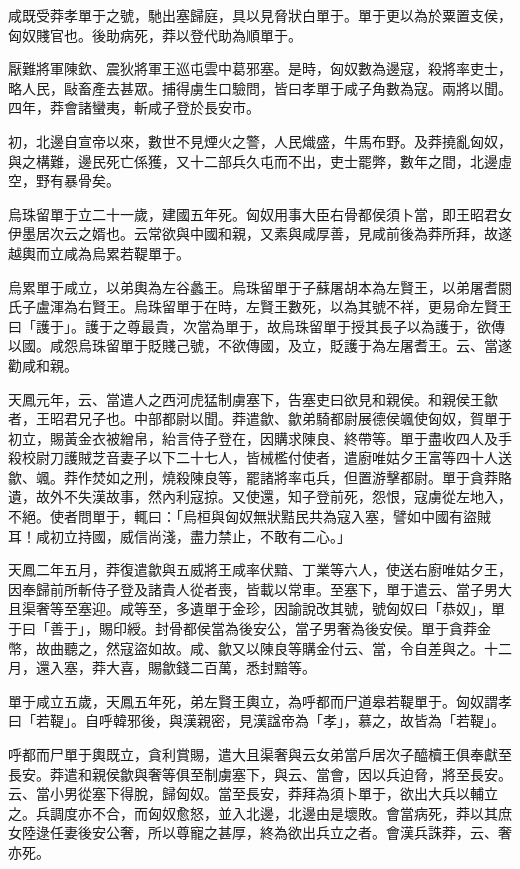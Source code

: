\begin{pinyinscope}
咸既受莽孝單于之號，馳出塞歸庭，具以見脅狀白單于。單于更以為於粟置支侯，匈奴賤官也。後助病死，莽以登代助為順單于。

厭難將軍陳欽、震狄將軍王巡屯雲中葛邪塞。是時，匈奴數為邊寇，殺將率吏士，略人民，敺畜產去甚眾。捕得虜生口驗問，皆曰孝單于咸子角數為寇。兩將以聞。四年，莽會諸蠻夷，斬咸子登於長安市。

初，北邊自宣帝以來，數世不見煙火之警，人民熾盛，牛馬布野。及莽撓亂匈奴，與之構難，邊民死亡係獲，又十二部兵久屯而不出，吏士罷弊，數年之間，北邊虛空，野有暴骨矣。

烏珠留單于立二十一歲，建國五年死。匈奴用事大臣右骨都侯須卜當，即王昭君女伊墨居次云之婿也。云常欲與中國和親，又素與咸厚善，見咸前後為莽所拜，故遂越輿而立咸為烏累若鞮單于。

烏累單于咸立，以弟輿為左谷蠡王。烏珠留單于子蘇屠胡本為左賢王，以弟屠耆閼氏子盧渾為右賢王。烏珠留單于在時，左賢王數死，以為其號不祥，更易命左賢王曰「護于」。護于之尊最貴，次當為單于，故烏珠留單于授其長子以為護于，欲傳以國。咸怨烏珠留單于貶賤己號，不欲傳國，及立，貶護于為左屠耆王。云、當遂勸咸和親。

天鳳元年，云、當遣人之西河虎猛制虜塞下，告塞吏曰欲見和親侯。和親侯王歙者，王昭君兄子也。中部都尉以聞。莽遣歙、歙弟騎都尉展德侯颯使匈奴，賀單于初立，賜黃金衣被繒帛，紿言侍子登在，因購求陳良、終帶等。單于盡收四人及手殺校尉刀護賊芝音妻子以下二十七人，皆械檻付使者，遣廚唯姑夕王富等四十人送歙、颯。莽作焚如之刑，燒殺陳良等，罷諸將率屯兵，但置游擊都尉。單于貪莽賂遺，故外不失漢故事，然內利寇掠。又使還，知子登前死，怨恨，寇虜從左地入，不絕。使者問單于，輒曰：「烏桓與匈奴無狀黠民共為寇入塞，譬如中國有盜賊耳！咸初立持國，威信尚淺，盡力禁止，不敢有二心。」

天鳳二年五月，莽復遣歙與五威將王咸率伏黯、丁業等六人，使送右廚唯姑夕王，因奉歸前所斬侍子登及諸貴人從者喪，皆載以常車。至塞下，單于遣云、當子男大且渠奢等至塞迎。咸等至，多遺單于金珍，因諭說改其號，號匈奴曰「恭奴」，單于曰「善于」，賜印綬。封骨都侯當為後安公，當子男奢為後安侯。單于貪莽金幣，故曲聽之，然寇盜如故。咸、歙又以陳良等購金付云、當，令自差與之。十二月，還入塞，莽大喜，賜歙錢二百萬，悉封黯等。

單于咸立五歲，天鳳五年死，弟左賢王輿立，為呼都而尸道皋若鞮單于。匈奴謂孝曰「若鞮」。自呼韓邪後，與漢親密，見漢諡帝為「孝」，慕之，故皆為「若鞮」。

呼都而尸單于輿既立，貪利賞賜，遣大且渠奢與云女弟當戶居次子醯櫝王俱奉獻至長安。莽遣和親侯歙與奢等俱至制虜塞下，與云、當會，因以兵迫脅，將至長安。云、當小男從塞下得脫，歸匈奴。當至長安，莽拜為須卜單于，欲出大兵以輔立之。兵調度亦不合，而匈奴愈怒，並入北邊，北邊由是壞敗。會當病死，莽以其庶女陸逯任妻後安公奢，所以尊寵之甚厚，終為欲出兵立之者。會漢兵誅莽，云、奢亦死。


\end{pinyinscope}

